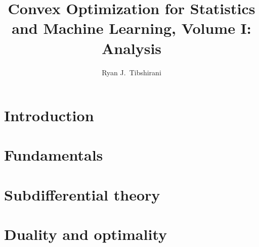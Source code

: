 \documentclass[oneside]{gsm-l} %
\numberwithin{section}{chapter}
\numberwithin{equation}{chapter}
\numberwithin{figure}{chapter}
\begin{document}
\frontmatter

\title{Convex Optimization for Statistics and Machine Learning, Volume I:
  Analysis} 
\author{Ryan J.\ Tibshirani}


\maketitle


\setcounter{page}{5} %
\setcounter{tocdepth}{1} %
\tableofcontents

%

\mainmatter

\part{Introduction}



\part{Fundamentals}




\part{Subdifferential theory}


 

\part{Duality and optimality}



\end{document}
